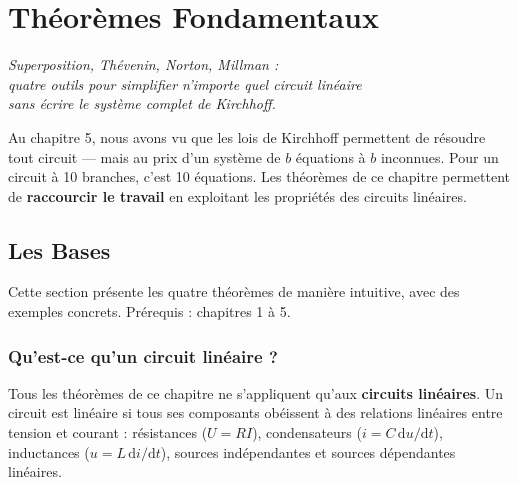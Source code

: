 \documentclass[12pt,a4paper,twoside]{book}
\begin{document}
\chapter{Théorèmes Fondamentaux}

\begin{center}
\textit{Superposition, Thévenin, Norton, Millman :\\
quatre outils pour simplifier n'importe quel circuit linéaire\\
sans écrire le système complet de Kirchhoff.}
\end{center}

\vspace{0.3cm}

Au chapitre 5, nous avons vu que les lois de Kirchhoff permettent de résoudre tout circuit --- mais au prix d'un système de $b$ équations à $b$ inconnues. Pour un circuit à 10 branches, c'est 10 équations. Les théorèmes de ce chapitre permettent de \textbf{raccourcir le travail} en exploitant les propriétés des circuits linéaires.

\section{Les Bases}

\begin{bases}
Cette section présente les quatre théorèmes de manière intuitive, avec des exemples concrets. Prérequis : chapitres 1 à 5.
\end{bases}

\subsection{Qu'est-ce qu'un circuit linéaire ?}

Tous les théorèmes de ce chapitre ne s'appliquent qu'aux \textbf{circuits linéaires}. Un circuit est linéaire si tous ses composants obéissent à des relations linéaires entre tension et courant : résistances ($U = RI$), condensateurs ($i = C\,\mathrm{d}u/\mathrm{d}t$), inductances ($u = L\,\mathrm{d}i/\mathrm{d}t$), sources indépendantes et sources dépendantes linéaires.
\end{document}
